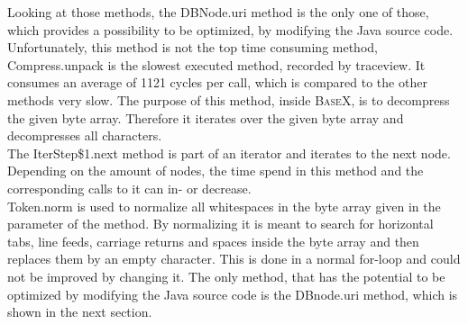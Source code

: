 Looking at those methods, the \textsf{DBNode.uri} method is the only one of those, which provides a possibility to be optimized, by modifying the Java source code.
Unfortunately, this method is not the top time consuming method, \textsf{Compress.unpack} is the slowest executed method, recorded by traceview.
It consumes an average of 1121 cycles per call, which is compared to the other methods very slow.
The purpose of this method, inside \textsc{BaseX}, is to decompress the given byte array.
Therefore it iterates over the given byte array and decompresses all characters.
\\
The \textsf{IterStep\$1.next} method is part of an iterator and iterates to the next node.
Depending on the amount of nodes, the time spend in this method and the corresponding calls to it can in- or decrease.
\\
\textsf{Token.norm} is used to normalize all whitespaces in the byte array given in the parameter of the method.
By normalizing it is meant to search for horizontal tabs, line feeds, carriage returns and spaces inside the byte array and then replaces them by an empty character.
This is done in a normal for-loop and could not be improved by changing it.
The only method, that has the potential to be optimized by modifying the Java source code is the \textsf{DBnode.uri} method, which is shown in the next section.


